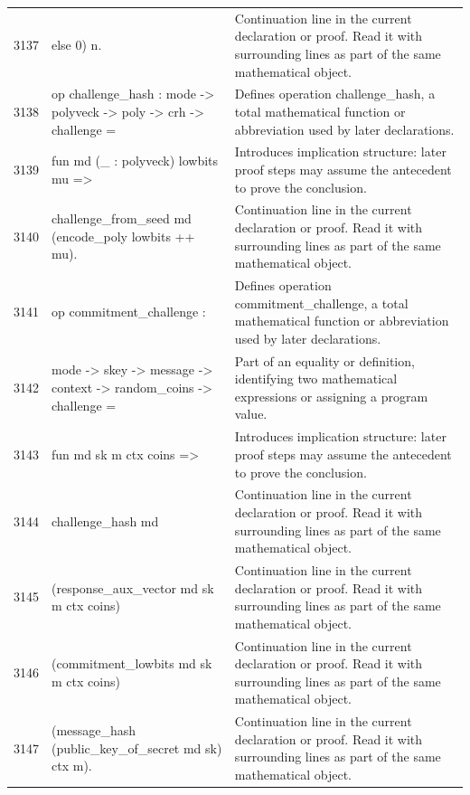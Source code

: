 \documentclass[10pt]{article}
\begin{document}
\begin{longtable}{r L{0.53\textwidth} L{0.37\textwidth}}
3137 & {\ttfamily\scriptsize       else 0) n.} & Continuation line in the current declaration or proof.  Read it with surrounding lines as part of the same mathematical object. \\
3138 & {\ttfamily\scriptsize op challenge\_hash : mode -> polyveck -> poly -> crh -> challenge =} & Defines operation challenge\_hash, a total mathematical function or abbreviation used by later declarations. \\
3139 & {\ttfamily\scriptsize   fun md (\_ : polyveck) lowbits mu =>} & Introduces implication structure: later proof steps may assume the antecedent to prove the conclusion. \\
3140 & {\ttfamily\scriptsize     challenge\_from\_seed md (encode\_poly lowbits ++ mu).} & Continuation line in the current declaration or proof.  Read it with surrounding lines as part of the same mathematical object. \\
3141 & {\ttfamily\scriptsize op commitment\_challenge :} & Defines operation commitment\_challenge, a total mathematical function or abbreviation used by later declarations. \\
3142 & {\ttfamily\scriptsize   mode -> skey -> message -> context -> random\_coins -> challenge =} & Part of an equality or definition, identifying two mathematical expressions or assigning a program value. \\
3143 & {\ttfamily\scriptsize   fun md sk m ctx coins =>} & Introduces implication structure: later proof steps may assume the antecedent to prove the conclusion. \\
3144 & {\ttfamily\scriptsize     challenge\_hash md} & Continuation line in the current declaration or proof.  Read it with surrounding lines as part of the same mathematical object. \\
3145 & {\ttfamily\scriptsize       (response\_aux\_vector md sk m ctx coins)} & Continuation line in the current declaration or proof.  Read it with surrounding lines as part of the same mathematical object. \\
3146 & {\ttfamily\scriptsize       (commitment\_lowbits md sk m ctx coins)} & Continuation line in the current declaration or proof.  Read it with surrounding lines as part of the same mathematical object. \\
3147 & {\ttfamily\scriptsize       (message\_hash (public\_key\_of\_secret md sk) ctx m).} & Continuation line in the current declaration or proof.  Read it with surrounding lines as part of the same mathematical object. \\

\end{longtable}
\end{document}
